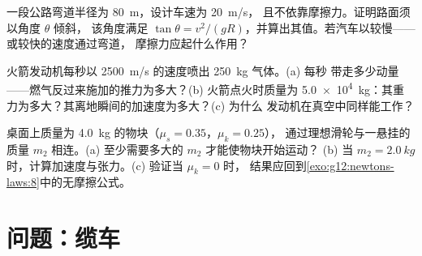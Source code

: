\begin{exercise}[$\star\star\star$]\label{exo:g12:newtons-laws:13}
一段公路弯道半径为 \qty{80}{m}，设计车速为 \qty{20}{m/s}，
且不依靠摩擦力。证明路面须以角度 $\theta$ 倾斜，
该角度满足 $\tan\theta = v^2/(gR)$，并算出其值。若汽车以较慢——或较快的速度通过弯道，
摩擦力应起什么作用？
\end{exercise}

\begin{exercise}[$\star\star\star$]\label{exo:g12:newtons-laws:14}
火箭发动机每秒以 \qty{2500}{m/s} 的速度喷出 \qty{250}{kg} 气体。(a) 每秒
带走多少动量——燃气反过来施加的推力为多大？(b) 火箭点火时质量为
\qty{5.0e4}{kg}：其重力为多大？其离地瞬间的加速度为多大？(c) 为什么
发动机在真空中同样能工作？
\end{exercise}

\begin{exercise}[$\star\star\star$]\label{exo:g12:newtons-laws:15}
桌面上质量为 \qty{4.0}{kg} 的物块（$\mu_s = 0.35$，$\mu_k = 0.25$），
通过理想滑轮与一悬挂的质量 $m_2$ 相连。(a) 至少需要多大的 $m_2$ 才能使物块开始运动？
(b) 当 $m_2 = \qty{2.0}{kg}$ 时，计算加速度与张力。(c) 验证当 $\mu_k = 0$ 时，
结果应回到\cref{exo:g12:newtons-laws:8}中的无摩擦公式。
\end{exercise}

\section{问题：缆车}

